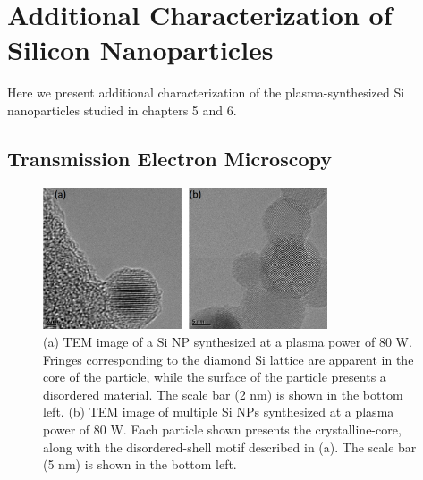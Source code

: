 \chapter{Additional Characterization of Silicon Nanoparticles}    %

Here we present additional characterization of the plasma-synthesized Si nanoparticles studied in chapters 5 and 6.

\section{Transmission Electron Microscopy}
\begin{figure}
\begin{center}
\includegraphics[width=0.75\textwidth]{./appendixC/siaddl1.png}
\caption[Transmission electron micrographs of plasma-synthesized Si NPs.]{(a) TEM image of a Si NP synthesized at a plasma power of 80 W. Fringes corresponding to the diamond Si lattice are apparent in the core of the particle, while the surface of the particle presents a disordered material. The scale bar (2 nm) is shown in the bottom left. (b) TEM image of multiple Si NPs synthesized at a plasma power of 80 W. Each particle shown presents the crystalline-core, along with the disordered-shell motif described in (a). The scale bar (5 nm) is shown in the bottom left.}
\label{f:siaddl1}
\end{center}
\end{figure}

